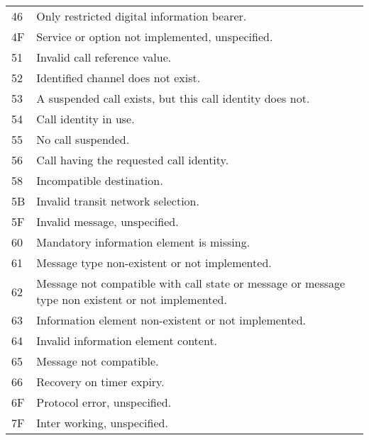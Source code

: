 \begin{description}
\begin{small}
\begin{longtable}{lp{12cm}}
  46 &   Only restricted digital information bearer. \\
  4F &   Service or option not implemented, unspecified. \\
  51 &   Invalid call reference value. \\
  52 &   Identified channel does not exist. \\
  53 &   A suspended call exists, but this call identity does not. \\
  54 &   Call identity in use. \\
  55 &   No call suspended. \\
  56 &   Call having the requested call identity. \\
  58 &   Incompatible destination. \\
  5B &   Invalid transit network selection. \\
  5F &   Invalid message, unspecified. \\
  60 &   Mandatory information element is missing. \\
  61 &   Message type non-existent or not implemented. \\
  62 &   Message not compatible with call state or message 
        or message type non existent or not implemented. \\
  63 &   Information element non-existent or not implemented. \\
  64 &   Invalid information element content. \\
  65 &   Message not compatible. \\
  66 &   Recovery on timer expiry. \\
  6F &   Protocol error, unspecified. \\
  7F &   Inter working, unspecified. \\
  \end{longtable}
  \end{small}
\end{description}
